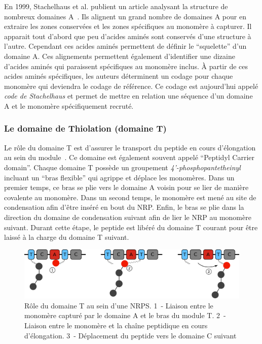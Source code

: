 En 1999, Stachelhaus et al. publient un article analysant la structure de nombreux domaines A~\cite{stachelhaus_specificity-conferring_1999}.
Ils alignent un grand nombre de domaines A pour en extraire les zones conservées et les zones spécifiques au monomère à capturer.
Il apparait tout d'abord que peu d'acides aminés sont conservés d'une structure à l'autre.
Cependant ces acides aminés permettent de définir le ``squelette'' d'un domaine A.
Ces alignements permettent également d'identifier une dizaine d'acides aminés qui paraissent spécifiques au monomère inclus.
À partir de ces acides aminés spécifiques, les auteurs déterminent un codage pour chaque monomère qui deviendra le codage de référence.
Ce codage est aujourd'hui appelé \textit{code de Stachelhaus} et permet de mettre en relation une séquence d'un domaine A et le monomère spécifiquement recruté.


\subsubsection{Le domaine de Thiolation (domaine T)}

Le rôle du domaine T est d'assurer le transport du peptide en cours d'élongation au sein du module~\cite{stachelhaus_biochemical_1996,calcott_portability_2015}.
Ce domaine est également souvent appelé ``Peptidyl Carrier domain''.
Chaque domaine T possède un groupement \textit{4’-phosphopantetheinyl} incluant un ``bras flexible'' qui agrippe et déplace les monomères.
Dans un premier temps, ce bras se plie vers le domaine A voisin pour se lier de manière covalente au monomère.
Dans un second temps, le monomère est mené au site de condensation afin d'être inséré en bout du NRP.
Enfin, le bras se plie dans la direction du domaine de condensation suivant afin de lier le NRP au monomère suivant.
Durant cette étape, le peptide est libéré du domaine T courant pour être laissé à la charge du domaine T suivant.

\begin{figure}[h!]
  \begin{center}
    \includegraphics[width=450px]{Figures/bio/Intro/T-domain.png}
    \caption{\label{T_domain}Rôle du domaine T au sein d'une NRPS.
    1~- Liaison entre le monomère capturé par le domaine A et le bras du module T.
    2~- Liaison entre le monomère et la chaîne peptidique en cours d'élongation.
    3~- Déplacement du peptide vers le domaine C suivant}
  \end{center}
\end{figure}

